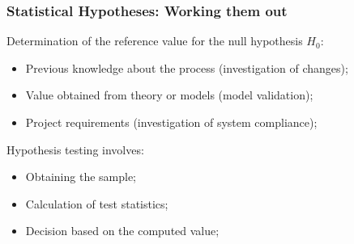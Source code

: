 \documentclass[10pt]{beamer}
\begin{document}
\begin{frame}
  \frametitle{Statistical Hypotheses: Working them out}
  Determination of the reference value for the null hypothesis $H_0$:
  \begin{itemize}
  \item Previous knowledge about the process (investigation of changes);
  \item Value obtained from theory or models (model validation);
  \item Project requirements (investigation of system compliance);
  \end{itemize}

  \bigskip

  Hypothesis testing involves:
  \begin{itemize}
  \item Obtaining the sample;
  \item Calculation of test statistics;
  \item Decision based on the computed value;
  \end{itemize}
\end{frame}
\end{document}
